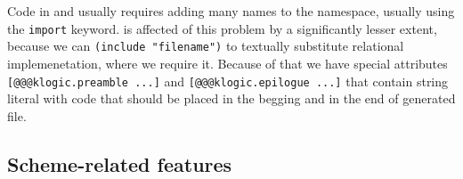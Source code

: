 Code in \Kotlin{} and \Java{} usually requires adding many names to the namespace, usually using the \verb=import= keyword.
\Scheme{} is affected of this problem by a significantly lesser extent, because we can \verb=(include "filename")= to textually substitute relational implemenetation, where we require it.
Because of that we have special attributes \verb=[@@@klogic.preamble ...]= and \verb=[@@@klogic.epilogue ...]= that contain string literal with \Kotlin{} code that should be placed in the begging and in the end of generated file.

\subsection{Scheme-related features}